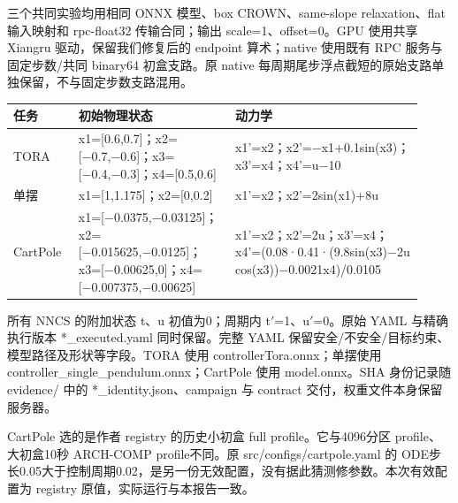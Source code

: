 \documentclass[UTF8,fontset=fandol,11pt,a4paper]{ctexart}
\begin{document}
\normalsize
三个共同实验均用相同 ONNX 模型、box CROWN、same-slope relaxation、flat 输入映射和 rpc-float32 传输合同；输出 scale=1、offset=0。GPU 使用共享 Xiangru 驱动，保留我们修复后的 endpoint 算术；native 使用既有 RPC 服务与固定步数/\allowbreak{}共同 binary64 初盒支路。原 native 每周期尾步浮点截短的原始支路单独保留，不与固定步数支路混用。

\small
\par\noindent
{\setlength{\tabcolsep}{2pt}\renewcommand{\arraystretch}{1.25}
\begin{tabular}{>{\raggedright\arraybackslash}p{0.138\linewidth}>{\raggedright\arraybackslash}p{0.359\linewidth}>{\raggedright\arraybackslash}p{0.423\linewidth}}
\toprule
\textbf{任务} & \textbf{初始物理状态} & \textbf{动力学} \\
\midrule
TORA & x1=[0.6,0.7]；x2=[−0.7,−0.6]；x3=[−0.4,−0.3]；x4=[0.5,0.6] & x1'=x2；x2'=−x1+0.1sin(x3)；x3'=x4；x4'=u−10 \\
单摆 & x1=[1,1.175]；x2=[0,0.2] & x1'=x2；x2'=2sin(x1)+8u \\
CartPole & x1=[−0.0375,−0.03125]；x2=[−0.015625,−0.0125]；x3=[−0.00625,0]；x4=[−0.007375,−0.00625] & x1'=x2；x2'=2u；x3'=x4；x4'=(0.08·0.41·(9.8sin(x3)−2u cos(x3))−0.0021x4)/\allowbreak{}0.0105 \\
\bottomrule
\end{tabular}
}
\par

\normalsize
所有 NNCS 的附加状态 t、u 初值为0；周期内 t$\prime$=1、u$\prime$=0。原始 YAML 与精确执行版本 *\_\allowbreak{}executed.yaml 同时保留。完整 YAML 保留安全/\allowbreak{}不安全/\allowbreak{}目标约束、模型路径及形状等字段。TORA 使用 controllerTora.onnx；单摆使用 controller\_\allowbreak{}single\_\allowbreak{}pendulum.onnx；CartPole 使用 model.onnx。SHA 身份记录随 evidence/\allowbreak{} 中的 *\_\allowbreak{}identity.json、campaign 与 contract 交付，权重文件本身保留服务器。

CartPole 选的是作者 registry 的历史小初盒 full profile。它与4096分区 profile、大初盒10秒 ARCH-COMP profile不同。原 src/\allowbreak{}configs/\allowbreak{}cartpole.yaml 的 ODE步长0.05大于控制周期0.02，是另一份无效配置，没有据此猜测修参数。本次有效配置为 registry 原值，实际运行与本报告一致。
\end{document}
